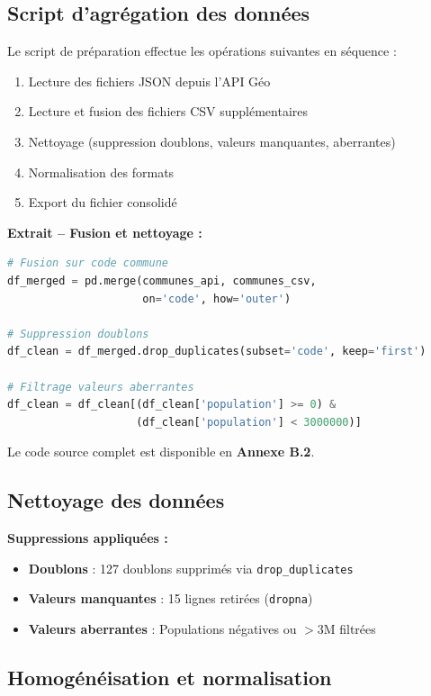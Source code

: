 \documentclass[12pt,a4paper]{article}
\begin{document}
\subsection{Script d'agrégation des données}

Le script de préparation effectue les opérations suivantes en séquence :
\begin{enumerate}
    \item Lecture des fichiers JSON depuis l'API Géo
    \item Lecture et fusion des fichiers CSV supplémentaires
    \item Nettoyage (suppression doublons, valeurs manquantes, aberrantes)
    \item Normalisation des formats
    \item Export du fichier consolidé
\end{enumerate}

\textbf{Extrait -- Fusion et nettoyage :}

\begin{lstlisting}[language=Python]
# Fusion sur code commune
df_merged = pd.merge(communes_api, communes_csv,
                     on='code', how='outer')

# Suppression doublons
df_clean = df_merged.drop_duplicates(subset='code', keep='first')

# Filtrage valeurs aberrantes
df_clean = df_clean[(df_clean['population'] >= 0) &
                    (df_clean['population'] < 3000000)]
\end{lstlisting}

Le code source complet est disponible en \textbf{Annexe B.2}.

\subsection{Nettoyage des données}

\textbf{Suppressions appliquées :}
\begin{itemize}
    \item \textbf{Doublons} : 127 doublons supprimés via \texttt{drop\_duplicates}
    \item \textbf{Valeurs manquantes} : 15 lignes retirées (\texttt{dropna})
    \item \textbf{Valeurs aberrantes} : Populations négatives ou $>$3M filtrées
\end{itemize}

\subsection{Homogénéisation et normalisation}
\end{document}
